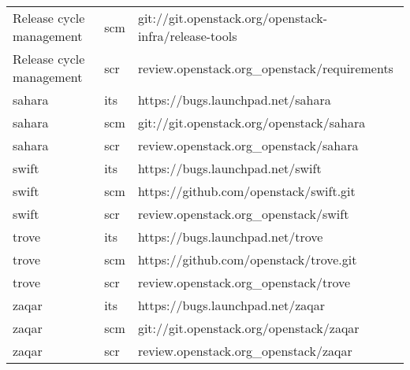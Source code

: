 \begin{center}
\begin{longtable}{|p{4cm}|p{1cm}|p{10cm}|}
Release cycle management&scm&git://git.openstack.org/openstack-infra/release-tools\\
Release cycle management&scr&review.openstack.org\_openstack/requirements\\
sahara&its&https://bugs.launchpad.net/sahara\\
sahara&scm&git://git.openstack.org/openstack/sahara\\
sahara&scr&review.openstack.org\_openstack/sahara\\
swift&its&https://bugs.launchpad.net/swift\\
swift&scm&https://github.com/openstack/swift.git\\
swift&scr&review.openstack.org\_openstack/swift\\
trove&its&https://bugs.launchpad.net/trove\\
trove&scm&https://github.com/openstack/trove.git\\
trove&scr&review.openstack.org\_openstack/trove\\
zaqar&its&https://bugs.launchpad.net/zaqar\\
zaqar&scm&git://git.openstack.org/openstack/zaqar\\
zaqar&scr&review.openstack.org\_openstack/zaqar\\

\hline
\end{longtable}
\end{center}

 
